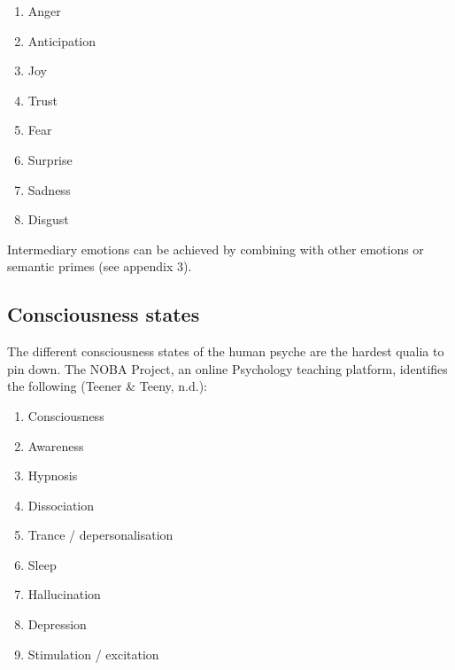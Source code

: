 \begin{enumerate}
\item   Anger 

\item   Anticipation 

\item   Joy 

\item   Trust 

\item   Fear 

\item   Surprise 
	
\item   Sadness 

\item   Disgust
\end{enumerate}

\noindent Intermediary emotions can be achieved by combining with other emotions or semantic primes (see appendix 3). 

\subsection{Consciousness states}

The different consciousness states of the human psyche are the hardest qualia to pin down. The NOBA Project, an online Psychology teaching platform, identifies the following (Teener \& Teeny, n.d.): 

\begin{enumerate}
\item   Consciousness 

\item   Awareness 

\item   Hypnosis 

\item   Dissociation 

\item   Trance / depersonalisation 

\item   Sleep 

\item   Hallucination 

\item   Depression 

\item   Stimulation / excitation
\end{enumerate}
 

